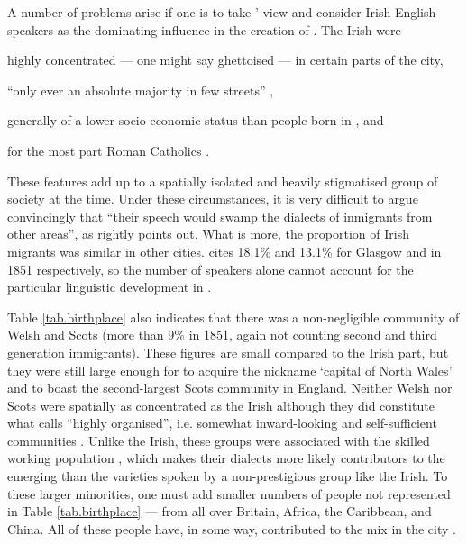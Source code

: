 A number of problems arise if one is to take \citeauthor{knowles1973}' view and consider Irish English speakers as the dominating influence in the creation of .
The Irish were
\begin{inparaenum}[a\upshape)]
	\item highly concentrated --- one might say ghettoised --- in certain parts of the city, 
	\item ``only ever an absolute majority in few streets'' \citep[120]{honeybone2007}, 
	\item generally of a lower socio-economic status than people born in , and
	\item for the most part Roman Catholics \citep[cf.][330]{belchemmacraild2006}.
\end{inparaenum}
These features add up to a spatially isolated and heavily stigmatised group of  society at the time.
Under these circumstances, it is very difficult to argue convincingly that ``their speech would swamp the dialects of inmigrants from other areas'', as \citet[120]{honeybone2007} rightly points out.
What is more, the proportion of Irish migrants was similar in other cities.
\citet[140]{honeybone2007} cites 18.1\% and 13.1\% for Glasgow and  in 1851 respectively, so the number of speakers alone cannot account for the particular linguistic development in .

Table \ref{tab.birthplace} also indicates that there was a non-negligible community of Welsh and Scots (more than 9\% in 1851, again not counting second and third generation immigrants).
These figures are small compared to the Irish part, but they were still large enough for  to acquire the nickname `capital of North Wales' and to boast the second-largest Scots community in England.
Neither Welsh nor Scots were spatially as concentrated as the Irish although they did constitute what \citeauthor{honeybone2007} calls ``highly organised'', i.e. somewhat inward-looking and self-sufficient communities \citep[cf.][120--121]{honeybone2007}.
Unlike the Irish, these groups were associated with the skilled working population \citep[cf.][202--203]{belchem2006b}, which makes their dialects more likely contributors to the emerging  than the varieties spoken by a non-prestigious group like the Irish.
To these larger minorities, one must add smaller numbers of people not represented in Table \ref{tab.birthplace} --- from all over Britain, Africa, the Caribbean, and China.
All of these people have, in some way, contributed to the  mix in the city \citep[cf.][116]{honeybone2007}.

